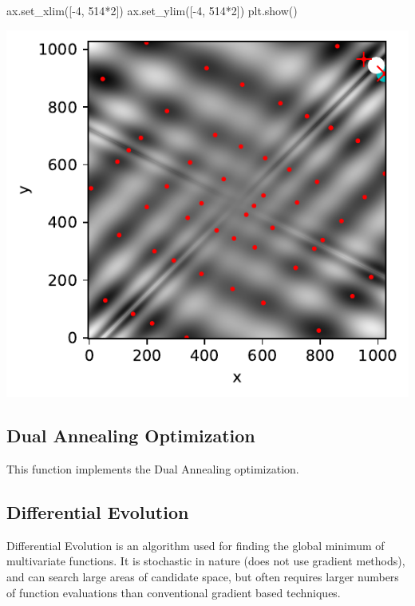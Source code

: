 \documentclass[
  letterpaper,
  DIV=11,
  numbers=noendperiod]{scrreprt}
\newenvironment{Shaded}{\begin{snugshade}}{\end{snugshade}}
\newcommand{\DecValTok}[1]{\textcolor[rgb]{0.68,0.00,0.00}{#1}}
\newcommand{\NormalTok}[1]{\textcolor[rgb]{0.00,0.23,0.31}{#1}}
\newcommand{\OperatorTok}[1]{\textcolor[rgb]{0.37,0.37,0.37}{#1}}
\begin{document}
\begin{Shaded}
\begin{Highlighting}[]
\NormalTok{ax.set\_xlim([}\OperatorTok{{-}}\DecValTok{4}\NormalTok{, }\DecValTok{514}\OperatorTok{*}\DecValTok{2}\NormalTok{])}
\NormalTok{ax.set\_ylim([}\OperatorTok{{-}}\DecValTok{4}\NormalTok{, }\DecValTok{514}\OperatorTok{*}\DecValTok{2}\NormalTok{])}
\NormalTok{plt.show()}
\end{Highlighting}
\end{Shaded}

\includegraphics{003_scipy_optimize_intro_files/figure-pdf/cell-17-output-1.pdf}

\subsection{Dual Annealing
Optimization}\label{dual-annealing-optimization}

This function implements the Dual Annealing optimization.

\subsection{Differential Evolution}\label{differential-evolution}

Differential Evolution is an algorithm used for finding the global
minimum of multivariate functions. It is stochastic in nature (does not
use gradient methods), and can search large areas of candidate space,
but often requires larger numbers of function evaluations than
conventional gradient based techniques.
\end{document}
